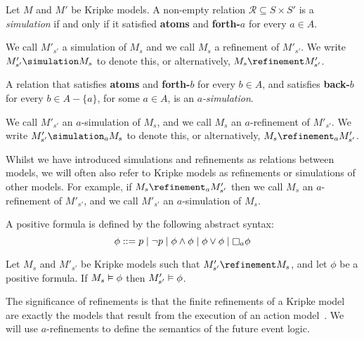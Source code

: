 \begin{definition}
Let $M$ and $M'$ be Kripke models. A non-empty relation $\mathcal{R}
\subseteq S \times S'$ is a \textit{simulation} if and only if it satisfied {\bf
atoms} and {\bf forth-$a$} for every $a \in A$.

We call $M'_{s'}$ a simulation of $M_s$ and we call $M_s$ a refinement of
$M'_{s'}$. We write $M'_{s'} \simulation M_s$ to denote this, or alternatively,
$M_s \refinement M'_{s'}$.

A relation that satisfies {\bf atoms} and {\bf forth-$b$} for every $b \in A$,
and satisfies {\bf back-$b$} for every $b \in A - \{a\}$, for some $a \in A$, is
an $a$\textit{-simulation}. 

We call $M'_{s'}$ an $a$-simulation of $M_s$, and we call $M_s$ an
$a$-refinement of $M'_{s'}$. We write $M'_{s'} \simulation_a M_s$ to denote
this, or alternatively, $M_s \refinement_a M'_{s'}$.
\end{definition}

Whilst we have introduced simulations and refinements as relations between
models, we will often also refer to Kripke models as refinements or simulations
of other models. For example, if $M_s \refinement_a M'_{s'}$ then we call $M_s$
an $a$-refinement of $M'_{s'}$, and we call $M'_{s'}$ an $a$-simulation of
$M_s$.

\begin{definition}
A positive formula is defined by the following abstract syntax:
$$
\phi ::=    p \bnfalt 
            \neg p \bnfalt
            \phi \land \phi \bnfalt
            \phi \lor \phi \bnfalt
            \knows_a \phi
$$
\end{definition}

\begin{lemma}
Let $M_s$ and $M'_{s'}$ be Kripke models such that $M'_{s'} \refinement M_s$,
and let $\phi$ be a positive formula. If $M_s \vDash \phi$ then $M'_{s'}
\vDash \phi$.
\end{lemma}


The significance of refinements is that the finite refinements of a Kripke model
are exactly the models that result from the execution of an action
model~\cite{french2009simulation}. We will use $a$-refinements to define the
semantics of the future event logic.
